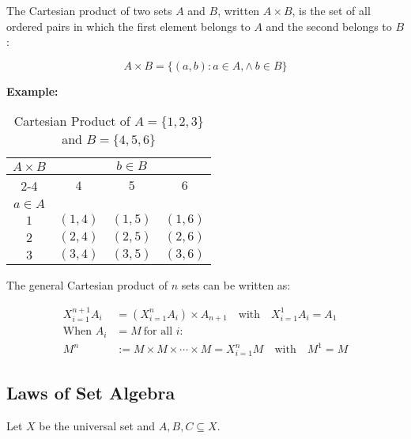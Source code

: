 The Cartesian product of two sets \(A\) and \(B\), written \(A \times B\), is the set of 
all ordered pairs in which the first element belongs to \(A\) and the second belongs to \(B\):

\[
	A \times B = \{ (a, b) : a \in A, \land\ b \in B\}
\]

\textbf{Example:}

\begin{table}[H]
	\centering
	\caption{Cartesian Product of \(A = \{1, 2, 3\}\) and \(B = \{4, 5, 6\}\)}
	\begin{tabular}{|c|c|c|c|}
		\hline
		\multirow{3}{*}{\(A \times B\)} & \multicolumn{3}{c|}{\(b \in B\)}                       \\
		\cline{2-4}
		                              & \(4\)                            & \(5\)      & \(6\)      \\
		\hline
		\(a \in A\)                     &                                &          &          \\
		\hline
		\(1\)                           & \((1, 4)\)                       & \((1, 5)\) & \((1, 6)\) \\
		\hline
		\(2\)                           & \((2, 4)\)                       & \((2, 5)\) & \((2, 6)\) \\
		\hline
		\(3\)                           & \((3, 4)\)                       & \((3, 5)\) & \((3, 6)\) \\
		\hline
	\end{tabular}
	\label{tab:cartesian_product}
\end{table}

The general Cartesian product of \(n\) sets can be written as:

\begin{align*}
	X_{i = 1}^{n + 1} A_i & = \left( X_{i = 1}^{n} A_i \right) \times A_{n + 1} \quad \text{with} \quad X_{i = 1}^{1} A_i = A_1 \\
	\text{When } A_i      & = M \ \text{for all } i:                                                                            \\
	M^n                   & := M \times M \times \cdots \times M = X_{i = 1}^{n} M \quad \text{with} \quad M^1 = M
\end{align*}

\subsection{Laws of Set Algebra}

Let \(X\) be the universal set and \(A, B, C \subseteq X\).

